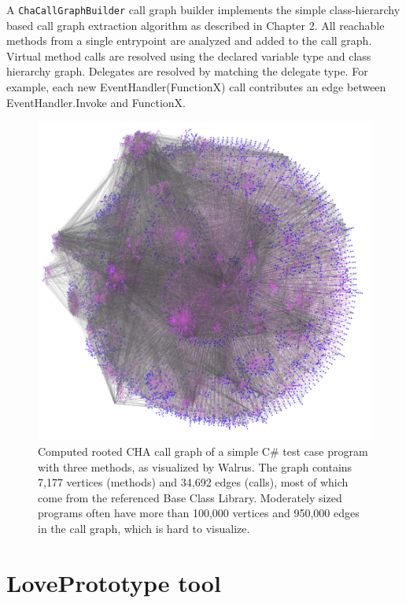 A \texttt{ChaCallGraphBuilder} call graph builder implements the simple class-hierarchy based call graph extraction algorithm as described in Chapter 2. All reachable methods from a single entrypoint are analyzed and added to the call graph. Virtual method calls are resolved using the declared variable type and class hierarchy graph. Delegates are resolved by matching the delegate type. For example, each new EventHandler(FunctionX) call contributes an edge between EventHandler.Invoke and FunctionX.

\begin{figure}
\begin{center}
\includegraphics[scale=0.5]{CallGraph.png}
\end{center}
\caption{Computed rooted CHA call graph of a simple C\# test case program with three methods, as visualized by Walrus. The graph contains 7,177 vertices (methods) and 34,692 edges (calls), most of which come from the referenced Base Class Library. Moderately sized programs often have more than 100,000 vertices and 950,000 edges in the call graph, which is hard to visualize.}
\end{figure}

\section{LovePrototype tool}

